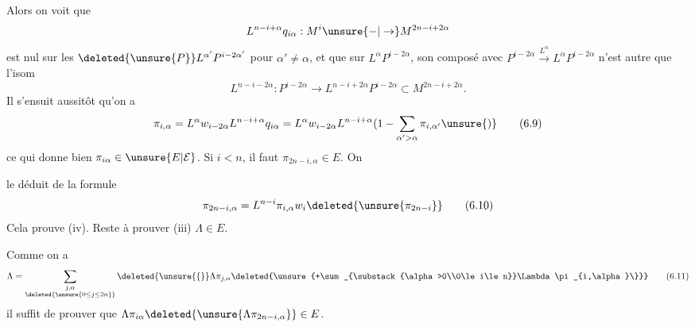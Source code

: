 
Alors on voit que
\[
 L^{n-i+\alpha}q_{i\alpha}: M^i\unsure{-|\to}M^{2n-i+2\alpha}
\]
est nul sur les $\deleted{\unsure{P}}L^{\alpha'}P^{i-2\alpha'}$ pour $\alpha'\ne\alpha$, et que sur $L^\alpha P^{i-2\alpha}$,  son composé avec $P^{i-2\alpha}\xrightarrow{L^\alpha} L^\alpha P^{i-2\alpha}$ n'est autre que l'isom
\[
 L^{n-i-2\alpha}:P^{i-2\alpha}\longrightarrow L^{n-i+2\alpha}P^{i-2\alpha}\subset M^{2n-i+2\alpha}.
\]
Il s'ensuit aussitôt qu'on a
\[
 \pi_{i,\alpha}=L^\alpha w_{i-2\alpha}L^{n-i+\alpha}q_{i\alpha}
 =L^\alpha w_{i-2\alpha}L^{n-i+\alpha}(1-\sum_{\alpha'>\alpha}\pi_{i,\alpha'}\unsure{)}
 \tag*{(6.9)}
\]
ce qui donne bien $\pi_{i\alpha}\in\unsure{E|\mathcal E}$.  Si $i<n$, il faut  $\pi_{2n-i,\alpha}\in E$. On

le déduit  de la formule
\[
 \pi_{2n-i,\alpha}=L^{n-i}\pi_{i,\alpha}w_i\deleted{\unsure{\pi_{2n-i}}}
 \tag*{(6.10)}
\]
Cela prouve  (iv). Reste à prouver (iii) $\Lambda\in E$.

Comme on a
\[
 \Lambda=\sum_{\substack{j,\alpha\\\deleted{\unsure{0\le j\le 2n}}}}\deleted{\unsure{\{}}\Lambda\pi_{j,\alpha}
 \deleted{\unsure{+\sum_{\substack{\alpha>0\\0\le i\le n}}\Lambda\pi_{i,\alpha}\}}}
 \tag*{(6.11)}
\]
il suffit de prouver que $\Lambda\pi_{i\alpha}\deleted{\unsure{\Lambda\pi_{2n-i,\alpha}}}\in E$.
